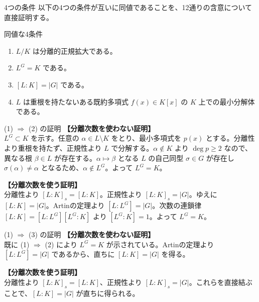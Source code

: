 \documentclass[11pt,dvipsnames]{beamer}
\begin{document}
\begin{frame}{4つの条件}
    以下の4つの条件が互いに同値であることを、12通りの含意について直接証明する。
    
    \begin{block}{同値な4条件}
        \begin{enumerate}
            \item[(1)] $L/K$ は分離的正規拡大である。
            \item[(2)] $L^G = K$ である。
            \item[(3)] $[L:K] = |G|$ である。
            \item[(4)] $L$ は重根を持たないある既約多項式 $f(x) \in K[x]$ の $K$ 上での最小分解体である。
        \end{enumerate}
    \end{block}
\end{frame}


\begin{frame}[allowframebreaks]{(1) $\Rightarrow$ (2) の証明}
    \textbf{【分離次数を使わない証明】}\\
    $L^G \subset K$ を示す。任意の $\alpha \in L \setminus K$ をとり、最小多項式を $p(x)$ とする。分離性より重根を持たず、正規性より $L$ で分解する。$\alpha \notin K$ より $\deg p \ge 2$ なので、異なる根 $\beta \in L$ が存在する。$\alpha \mapsto \beta$ となる $L$ の自己同型 $\sigma \in G$ が存在し $\sigma(\alpha) \neq \alpha$ となるため、$\alpha \notin L^G$。よって $L^G = K$。

    \vspace{1em}
    \textbf{【分離次数を使う証明】}\\
    分離性より $[L:K]_s = [L:K]$。正規性より $[L:K]_s = |G|$。ゆえに $[L:K] = |G|$。Artinの定理より $[L:L^G] = |G|$。次数の連鎖律 $[L:K] = [L:L^G][L^G:K]$ より $[L^G:K] = 1$。よって $L^G = K$。
\end{frame}

\begin{frame}[allowframebreaks]{(1) $\Rightarrow$ (3) の証明}
    \textbf{【分離次数を使わない証明】}\\
    既に (1) $\Rightarrow$ (2) により $L^G = K$ が示されている。Artinの定理より $[L:L^G] = |G|$ であるから、直ちに $[L:K] = |G|$ を得る。

    \vspace{1em}
    \textbf{【分離次数を使う証明】}\\
    分離性より $[L:K]_s = [L:K]$、正規性より $[L:K]_s = |G|$。これらを直接結ぶことで、$[L:K] = |G|$ が直ちに得られる。
\end{frame}
\end{document}
